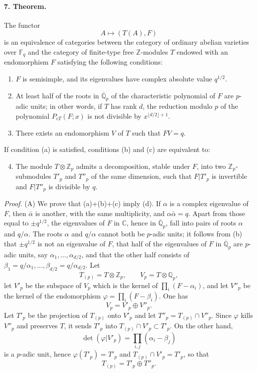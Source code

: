\documentclass[10pt]{article}
\newcommand{\C}{\mathbb C}
\newcommand{\Fq}{\mathbb F_q}
\newcommand{\Q}{\mathbb Q}
\newcommand{\Z}{\mathbb Z}
\begin{document}
\paragraph{7. Theorem.} The functor
\[
A\longmapsto (T(A),F)
\]
is an equivalence of categories between the category of ordinary abelian varieties over $\Fq$ and the category of finite-type free $\Z$-modules $T$ endowed with an endomorphism $F$ satisfying the following conditions:
\begin{enumerate}[label=(\alph*)]
\item $F$ is semisimple, and its eigenvalues have complex absolute value $q^{1/2}$.
\item At least half of the roots in $\overline{\Q}_p$ of the characteristic polynomial of $F$ are $p$-adic units; in other words, if $T$ has rank $d$, the reduction modulo $p$ of the polynomial $P_{cT}(F;x)$ is not divisible by $x^{\lfloor d/2\rfloor+1}$.
\item There exists an endomorphism $V$ of $T$ such that $FV=q$.
\end{enumerate}
If condition (a) is satisfied, conditions (b) and (c) are equivalent to:
\begin{enumerate}[label=(\alph*)]
\setcounter{enumi}{3}
\item The module $T\otimes\Z_p$ admits a decomposition, stable under $F$, into two $\Z_p$-submodules $T'_p$ and $T''_p$ of the same dimension, such that $F|T'_p$ is invertible and $F|T''_p$ is divisible by $q$.
\end{enumerate}

\emph{Proof.} (A) We prove that (a)+(b)+(c) imply (d). If $\alpha$ is a complex eigenvalue of $F$, then $\bar\alpha$ is another, with the same multiplicity, and $\alpha\bar\alpha=q$. Apart from those equal to $\pm q^{1/2}$, the eigenvalues of $F$ in $\C$, hence in $\overline{\Q}_p$, fall into pairs of roots $\alpha$ and $q/\alpha$. The roots $\alpha$ and $q/\alpha$ cannot both be $p$-adic units; it follows from (b) that $\pm q^{1/2}$ is not an eigenvalue of $F$, that half of the eigenvalues of $F$ in $\overline{\Q}_p$ are $p$-adic units, say $\alpha_1,\ldots,\alpha_{d/2}$, and that the other half consists of $\beta_1=q/\alpha_1,\ldots,\beta_{d/2}=q/\alpha_{d/2}$. Let
\[
T_{(p)}=T\otimes\Z_p,\qquad V_p=T\otimes\Q_p,
\]
let $V'_p$ be the subspace of $V_p$ which is the kernel of $\prod_i(F-\alpha_i)$, and let $V''_p$ be the kernel of the endomorphism $\varphi=\prod_i(F-\beta_i)$. One has
\[
V_p=V'_p\oplus V''_p.
\]
Let $T'_p$ be the projection of $T_{(p)}$ onto $V'_p$ and let $T''_p=T_{(p)}\cap V''_p$. Since $\varphi$ kills $V''_p$ and preserves $T$, it sends $T'_p$ into $T_{(p)}\cap V'_p\subset T'_p$. On the other hand,
\[
\det(\varphi|V'_p)=\prod_{i,j}(\alpha_i-\beta_j)
\]
is a $p$-adic unit, hence $\varphi(T'_p)=T'_p$ and $T_{(p)}\cap V'_p=T'_p$, so that
\[
T_{(p)}=T'_p\oplus T''_p.
\]
\end{document}
